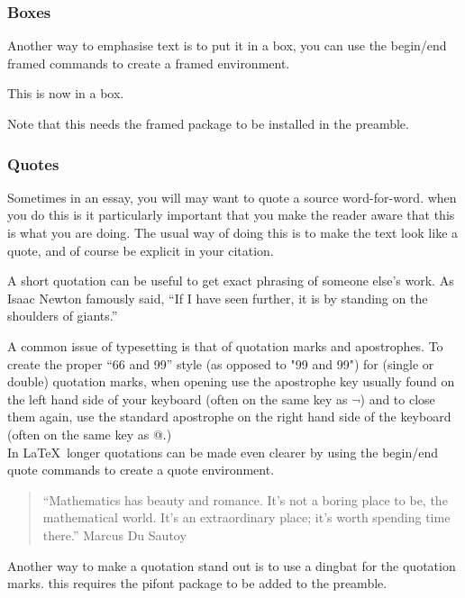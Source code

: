\documentclass[a4paper,11pt]{article}
\begin{document}
\subsubsection{Boxes}

Another way to emphasise text is to put it in a box, you can use the begin/end framed commands to create a framed environment.
\begin{framed}
This is now in a  box.
\end{framed}
Note that this needs the framed package to be installed in the preamble.




\subsubsection{Quotes}

Sometimes in an essay, you will may want to quote a source word-for-word. when you do this is it particularly important that you make the reader aware that this is what you are doing. The usual way of doing this is to make the text look like a quote, and of course be explicit in your citation.

A short quotation can be useful to get exact phrasing of someone else's work. As Isaac Newton famously said, ``If I have seen further, it is by standing on the shoulders of giants.''

A common issue of typesetting is that of quotation marks and apostrophes. To create the proper ``66 and 99'' style (as opposed to  "99 and 99") for (single or double) quotation marks, when opening use the apostrophe key usually found on the left hand side of your keyboard (often on the same key as $\neg$) and to close them again, use the standard apostrophe on the right hand side of the keyboard (often on the same key as @.)\\

In \LaTeX \, longer quotations can be made even clearer by using the begin/end quote commands to create a quote environment.


\begin{quote}
``Mathematics has beauty and romance. It's not a boring place to be, the mathematical world. It's an extraordinary place; it's worth spending time there.''
\hfill Marcus Du Sautoy
\end{quote}

Another way to make a quotation stand out is to use a dingbat for the quotation marks. this requires the pifont package to be added to the preamble.
\end{document}
